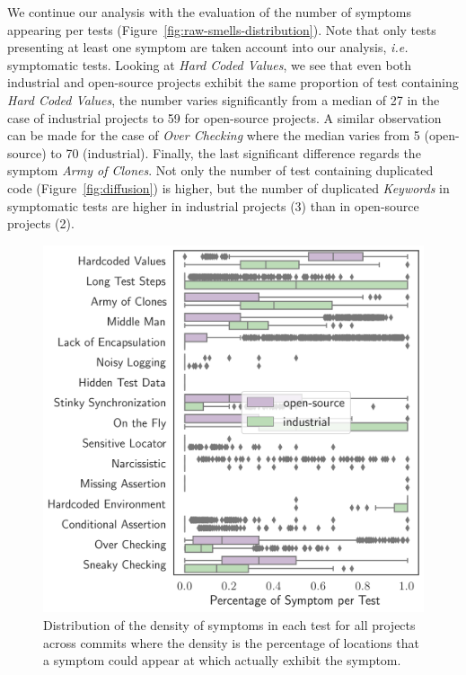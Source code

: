 We continue our analysis with the evaluation of the number of symptoms appearing per tests (Figure~\ref{fig:raw-smells-distribution}). Note that only tests presenting at least one symptom are taken account into our analysis, \emph{i.e.} symptomatic tests. Looking at \emph{Hard Coded Values}, we see that even both industrial and open-source projects exhibit the same proportion of test containing \emph{Hard Coded Values}, the number varies significantly from a median of 27 in the case of industrial projects to 59 for open-source projects. A similar observation can be made for the case of \emph{Over Checking} where the median varies from 5 (open-source) to 70 (industrial). Finally, the last significant difference regards the symptom \emph{Army of Clones}. Not only the number of test containing duplicated code (Figure~\ref{fig:diffusion}) is higher, but the number of duplicated \emph{Keywords} in symptomatic tests are higher in industrial projects (3) than in open-source projects (2).


\begin{figure}
\centering
\includegraphics[width=0.9\linewidth]{figures/smells/smell-normalized-distribution-boxplot.png}
\caption{Distribution of the density of symptoms in each test for all projects across commits where the density is the percentage of locations that a symptom could appear at which actually exhibit the symptom.}  
\label{fig:normalized-smells-distribution}
\end{figure}

